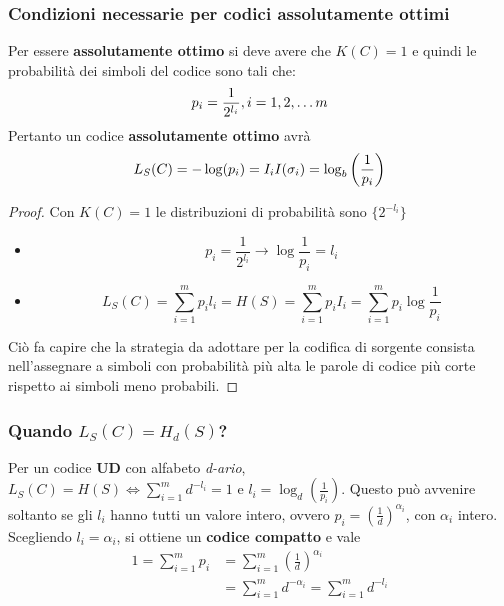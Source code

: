 \subsubsection{Condizioni necessarie per codici assolutamente ottimi}
Per essere \textbf{assolutamente ottimo} si deve avere che $K(C) = 1$ e quindi le probabilità dei simboli del codice sono tali che:
\[p_i= \frac{1}{2^{l_i}} \space , \space i=1, 2, \dots m\]
Pertanto un codice \textbf{assolutamente ottimo} avrà
\[L_S(C) = -\log(p_i) = I_i \space\space I(\sigma_i) = \log_b\left(\frac{1}{p_i}\right)\]

\begin{proof}
Con $K(C)=1$ le distribuzioni di probabilità sono $\{2^{-l_i}\}$
\begin{itemize}
    \item \[p_i = \frac{1}{2^{l_i}} \rightarrow \log\frac{1}{p_i}= l_i\]
    \item \[L_S(C) = \sum_{i=1}^{m}p_il_i = H(S)=\sum_{i=1}^{m}p_iI_i = \sum_{i=1}^{m}p_i\log\frac{1}{p_i}\] 
\end{itemize}
Ciò fa capire che la strategia da adottare per la codifica di sorgente consista nell'assegnare a simboli con probabilità più alta le parole di codice più corte rispetto ai simboli meno probabili.
\end{proof}

\subsubsection{Quando $L_S(C) = H_d(S)$?}
Per un codice \textbf{UD} con alfabeto \textit{d-ario}, $L_S(C) = H(S) \iff \sum_{i=1}^{m}d^{-l_i}=1 \text{ e } l_i=\log_d\left(\frac{1}{p_i}\right)$.
Questo può avvenire soltanto se gli $l_i$ hanno tutti un valore intero, ovvero $p_i = \left(\frac{1}{d}\right)^{\alpha_i}$,
con $\alpha_i$ intero.
Scegliendo $l_i=\alpha_i$, si ottiene un \textbf{codice compatto} e vale
\begin{align*}
1 = \sum_{i=1}^m p_i &= \sum_{i=1}^m \left(\frac{1}{d}\right)^{\alpha_i} \\
                     &= \sum_{i=1}^m d^{-\alpha_i} = \sum_{i=1}^m d^{-l_i}
\end{align*}

\clearpage